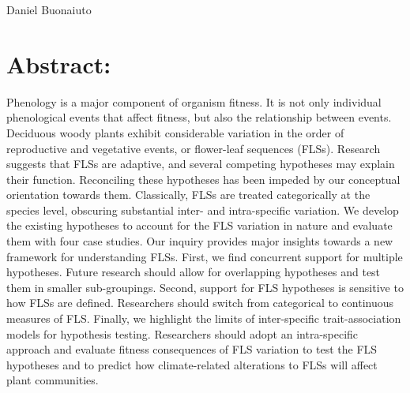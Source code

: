 \documentclass[10.5pt,a4paper]{article}
\begin{document}
Daniel Buonaiuto
\newpage
\section*{Abstract:}
Phenology is a major component of organism fitness. It is not only individual phenological events that affect fitness, but also the relationship between events. Deciduous woody plants exhibit considerable variation in the order of reproductive and vegetative events, or flower-leaf sequences (FLSs). Research suggests that FLSs are adaptive, and several competing hypotheses may explain their function. Reconciling these hypotheses has been impeded by our conceptual orientation towards them. Classically, FLSs are treated categorically at the species level, obscuring substantial inter- and intra-specific variation. We develop the existing hypotheses to account for the FLS variation in nature and evaluate them with four case studies. Our inquiry provides major insights towards a new framework for understanding FLSs. First, we find concurrent support for multiple hypotheses. Future research should allow for overlapping hypotheses and test them in smaller sub-groupings. Second, support for FLS hypotheses is sensitive to how FLSs are defined. Researchers should switch from categorical to continuous measures of FLS. Finally, we highlight the limits of inter-specific trait-association models for hypothesis testing. Researchers should adopt an intra-specific approach and evaluate fitness consequences of FLS variation to test the FLS hypotheses and to predict how climate-related alterations to FLSs will affect plant communities.
\end{document}
